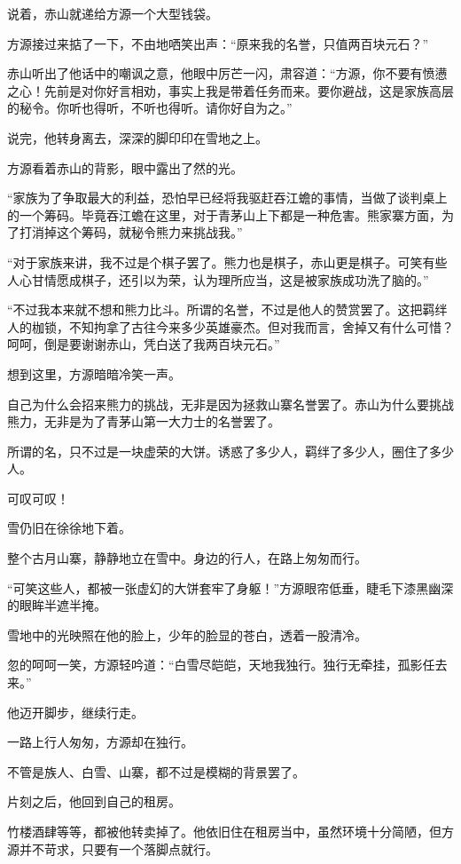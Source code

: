 \begin{this_body}
说着，赤山就递给方源一个大型钱袋。

方源接过来掂了一下，不由地哂笑出声：“原来我的名誉，只值两百块元石？”

赤山听出了他话中的嘲讽之意，他眼中厉芒一闪，肃容道：“方源，你不要有愤懑之心！先前是对你好言相劝，事实上我是带着任务而来。要你避战，这是家族高层的秘令。你听也得听，不听也得听。请你好自为之。”

说完，他转身离去，深深的脚印印在雪地之上。

方源看着赤山的背影，眼中露出了然的光。

“家族为了争取最大的利益，恐怕早已经将我驱赶吞江蟾的事情，当做了谈判桌上的一个筹码。毕竟吞江蟾在这里，对于青茅山上下都是一种危害。熊家寨方面，为了打消掉这个筹码，就秘令熊力来挑战我。”

“对于家族来讲，我不过是个棋子罢了。熊力也是棋子，赤山更是棋子。可笑有些人心甘情愿成棋子，还引以为荣，认为理所应当，这是被家族成功洗了脑的。”

“不过我本来就不想和熊力比斗。所谓的名誉，不过是他人的赞赏罢了。这把羁绊人的枷锁，不知拘拿了古往今来多少英雄豪杰。但对我而言，舍掉又有什么可惜？呵呵，倒是要谢谢赤山，凭白送了我两百块元石。”

想到这里，方源暗暗冷笑一声。

自己为什么会招来熊力的挑战，无非是因为拯救山寨名誉罢了。赤山为什么要挑战熊力，无非是为了青茅山第一大力士的名誉罢了。

所谓的名，只不过是一块虚荣的大饼。诱惑了多少人，羁绊了多少人，圈住了多少人。

可叹可叹！

雪仍旧在徐徐地下着。

整个古月山寨，静静地立在雪中。身边的行人，在路上匆匆而行。

“可笑这些人，都被一张虚幻的大饼套牢了身躯！”方源眼帘低垂，睫毛下漆黑幽深的眼眸半遮半掩。

雪地中的光映照在他的脸上，少年的脸显的苍白，透着一股清冷。

忽的呵呵一笑，方源轻吟道：“白雪尽皑皑，天地我独行。独行无牵挂，孤影任去来。”

他迈开脚步，继续行走。

一路上行人匆匆，方源却在独行。

不管是族人、白雪、山寨，都不过是模糊的背景罢了。

片刻之后，他回到自己的租房。

竹楼酒肆等等，都被他转卖掉了。他依旧住在租房当中，虽然环境十分简陋，但方源并不苛求，只要有一个落脚点就行。


\end{this_body}

